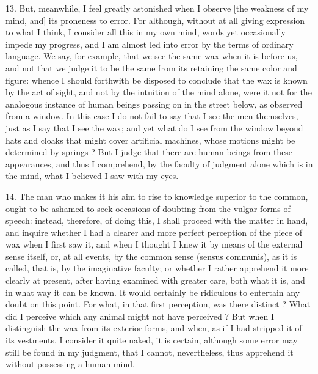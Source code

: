 13. But, meanwhile, I feel greatly astonished when I observe [the weakness of my mind, and] its proneness to error. For although, without at all giving expression to what I think, I consider all this in my own mind, words yet occasionally impede my progress, and I am almost led into error by the terms of ordinary language. We say, for example, that we see the same wax when it is before us, and not that we judge it to be the same from its retaining the same color and figure: whence I should forthwith be disposed to conclude that the wax is known by the act of sight, and not by the intuition of the mind alone, were it not for the analogous instance of human beings passing on in the street below, as observed from a window. In this case I do not fail to say that I see the men themselves, just as I say that I see the wax; and yet what do I see from the window beyond hats and cloaks that might cover artificial machines, whose motions might be determined by springs ? But I judge that there are human beings from these appearances, and thus I comprehend, by the faculty of judgment alone which is in the mind, what I believed I saw with my eyes.

14. The man who makes it his aim to rise to knowledge superior to the common, ought to be ashamed to seek occasions of doubting from the vulgar forms of speech: instead, therefore, of doing this, I shall proceed with the matter in hand, and inquire whether I had a clearer and more perfect perception of the piece of wax when I first saw it, and when I thought I knew it by means of the external sense itself, or, at all events, by the common sense (sensus communis), as it is called, that is, by the imaginative faculty; or whether I rather apprehend it more clearly at present, after having examined with greater care, both what it is, and in what way it can be known. It would certainly be ridiculous to entertain any doubt on this point. For what, in that first perception, was there distinct ? What did I perceive which any animal might not have perceived ? But when I distinguish the wax from its exterior forms, and when, as if I had stripped it of its vestments, I consider it quite naked, it is certain, although some error may still be found in my judgment, that I cannot, nevertheless, thus apprehend it without possessing a human mind.

